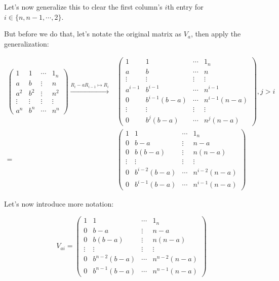 \documentclass{report}
\begin{document}
{{		Let's now generalize this to clear the first column's \(i\)th entry for \(i \in \{n, n-1, \cdots, 2\}\).

		But before we do that, let's notate the original matrix as \(V_{a}\), then apply the generalization:

		\begin{align*}
			\begin{pmatrix} 1 & 1 & \cdots & 1_{n} \\ a & b & \vdots & n \\ a^2 & b^2 & \vdots & n^2 \\ \vdots & \vdots & \vdots & \vdots \\ a^{n} &  b^{n} & \cdots & n^{n} \end{pmatrix} \xrightarrow{R_{i} - aR_{i - 1} \mapsto R_{i}} & \begin{pmatrix} 1 & 1 & \cdots & 1_{n} \\ a & b & \cdots & n \\ \vdots & \vdots & \vdots & \vdots \\ a^{i - 1} & b^{i - 1} & \cdots & n^{i - 1} \\ 0 &  b^{i - 1} (b - a) & \cdots & n^{i - 1} (n - a) \\ \vdots & \vdots & \vdots & \vdots \\ 0 &  b^{j} (b - a) & \cdots & n^{j} (n - a) \end{pmatrix}, j > i \\
			=                                                                                                                                                                                                                             & \begin{pmatrix} 1 & 1 & \cdots & 1_{n} \\ 0 & b - a & \vdots & n - a \\ 0 & b(b - a) & \vdots & n(n - a) \\ \vdots & \vdots & \vdots & \vdots \\ 0 & b^{i - 2}(b - a) & \cdots & n^{i - 2}(n - a) \\ 0 &  b^{i-1} (b - a) & \cdots & n^{i-1} (n - a) \end{pmatrix}
		\end{align*}

	}

Let's now introduce more notation:

\[
	V_{ai} = \begin{pmatrix} 1 & 1 & \cdots & 1_{n} \\ 0 & b - a & \vdots & n - a \\ 0 & b(b - a) & \vdots & n(n - a) \\ \vdots & \vdots & \vdots & \vdots \\ 0 & b^{n - 2}(b - a) & \cdots & n^{n - 2}(n - a) \\ 0 &  b^{n-1} (b - a) & \cdots & n^{n-1} (n - a) \end{pmatrix}
\]

}
\end{document}
